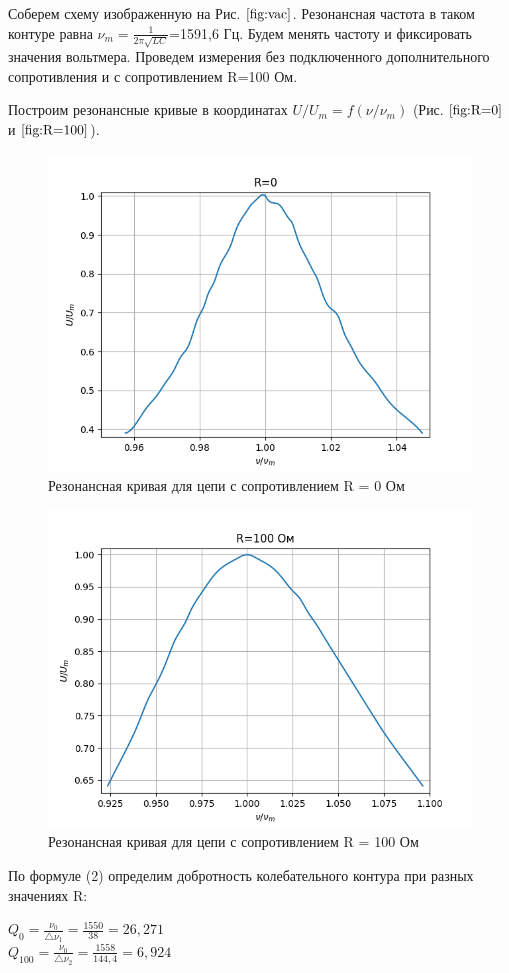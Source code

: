 \documentclass[a4paper, fontsize = 14pt]{article}
\begin{document}
Соберем схему изображенную на Рис. $\ref{fig:vac}$. Резонансная частота в таком контуре равна $\nu_m=\frac{1}{2\pi\sqrt{LC}}$=1591,6 Гц. Будем менять частоту и фиксировать значения вольтмера. Проведем измерения без подключенного дополнительного сопротивления и с сопротивлением R=100 Ом.

Построим резонансные кривые в координатах $U/U_m = f(\nu/\nu_m)$ (Рис. $\ref{fig:R=0}$ и $\ref{fig:R=100}$).
\begin{figure}[h!]
    \centering
    \includegraphics[width=12cm]{R=0.png}
    \caption{Резонансная кривая для цепи с сопротивлением R = 0 Ом}
    \label{fig:R=0}
\end{figure}
\begin{figure}[h!]
    \centering
    \includegraphics[width=12cm]{R=100.png}
    \caption{Резонансная кривая для цепи с сопротивлением R = 100 Ом}
    \label{fig:R=100}
\end{figure}
По формуле (2) определим добротность колебательного контура при разных значениях R:
\begin{center}
$Q_0 = \frac{\nu_0}{\triangle \nu_1} = \frac{1550}{38} = 26,271$ \\
$Q_{100} = \frac{\nu_0}{\triangle \nu_2} = \frac{1558}{144,4} = 6,924$
\end{center}
\end{document}
